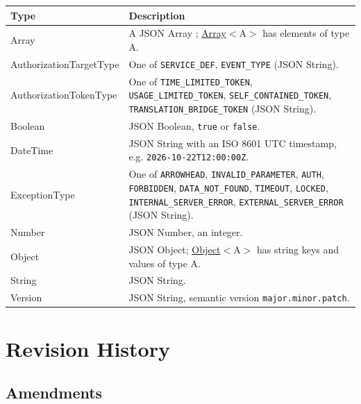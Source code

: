 \documentclass[a4paper]{arrowhead}
\newcommand{\pdef}[1]{{\textcolor{ArrowheadGrey}{#1 \label{sec:model:primitives:#1} \label{sec:model:primitives:#1s}}}}
\newcommand{\pref}[1]{{\textcolor{ArrowheadGrey}{\hyperref[sec:model:primitives:#1]{#1}}}}
\begin{document}
\noindent\begin{tabularx}{\textwidth}{| p{4.6cm} | X |} \hline
\rowcolor{gray!33} Type & Description \\ \hline
\pdef{Array} & A JSON Array \cite{rfc8259}; \pref{Array}$<$A$>$ has elements of type A. \\ \hline
\pdef{AuthorizationTargetType} & One of \texttt{SERVICE\_\allowbreak{}DEF}, \texttt{EVENT\_\allowbreak{}TYPE} (JSON String). \\ \hline
\pdef{AuthorizationTokenType} & One of \texttt{TIME\_\allowbreak{}LIMITED\_\allowbreak{}TOKEN}, \texttt{USAGE\_\allowbreak{}LIMITED\_\allowbreak{}TOKEN}, \texttt{SELF\_\allowbreak{}CONTAINED\_\allowbreak{}TOKEN}, \texttt{TRANSLATION\_\allowbreak{}BRIDGE\_\allowbreak{}TOKEN} (JSON String). \\ \hline
\pdef{Boolean} & JSON Boolean, \texttt{true} or \texttt{false}. \\ \hline
\pdef{DateTime} & JSON String with an ISO 8601 UTC timestamp, e.g. \texttt{2026-10-22T12:00:00Z}. \\ \hline
\pdef{ExceptionType} & One of \texttt{ARROWHEAD}, \texttt{INVALID\_\allowbreak{}PARAMETER}, \texttt{AUTH}, \texttt{FORBIDDEN}, \texttt{DATA\_\allowbreak{}NOT\_\allowbreak{}FOUND}, \texttt{TIMEOUT}, \texttt{LOCKED}, \texttt{INTERNAL\_\allowbreak{}SERVER\_\allowbreak{}ERROR}, \texttt{EXTERNAL\_\allowbreak{}SERVER\_\allowbreak{}ERROR} (JSON String). \\ \hline
\pdef{Number} & JSON Number, an integer. \\ \hline
\pdef{Object} & JSON Object; \pref{Object}$<$A$>$ has string keys and values of type A. \\ \hline
\pdef{String} & JSON String. \\ \hline
\pdef{Version} & JSON String, semantic version \texttt{major.minor.patch}. \\ \hline
\end{tabularx}

\newpage




\newpage

\section{Revision History}
\subsection{Amendments}
\end{document}
